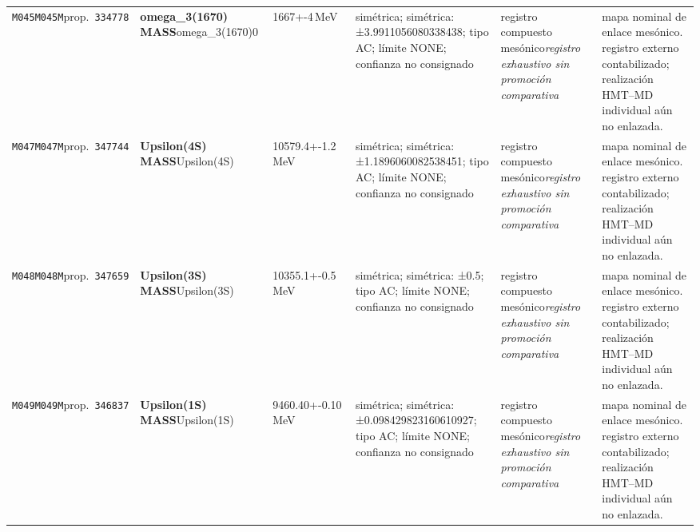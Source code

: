 \begin{landscape}
\begin{longtable}{L{1.85cm}L{4.45cm}L{2.35cm}L{4.05cm}L{3.35cm}L{7.15cm}}
\texttt{M045}\newline \texttt{M045M}\newline prop.\ \texttt{334778} & \textbf{omega\_\allowbreak{}3(1670) MASS}\newline omega\_\allowbreak{}3(1670)0 & 1667+-4\,MeV & simétrica; simétrica: ±3.9911056080338438; tipo AC; límite NONE; confianza no consignado & registro compuesto mesónico\newline \emph{registro exhaustivo sin promoción comparativa} & mapa nominal de enlace mesónico. registro externo contabilizado; realización HMT--MD individual aún no enlazada. \\
\texttt{M047}\newline \texttt{M047M}\newline prop.\ \texttt{347744} & \textbf{Upsilon(4S) MASS}\newline Upsilon(4S) & 10579.4+-1.2\,MeV & simétrica; simétrica: ±1.1896060082538451; tipo AC; límite NONE; confianza no consignado & registro compuesto mesónico\newline \emph{registro exhaustivo sin promoción comparativa} & mapa nominal de enlace mesónico. registro externo contabilizado; realización HMT--MD individual aún no enlazada. \\
\texttt{M048}\newline \texttt{M048M}\newline prop.\ \texttt{347659} & \textbf{Upsilon(3S) MASS}\newline Upsilon(3S) & 10355.1+-0.5\,MeV & simétrica; simétrica: ±0.5; tipo AC; límite NONE; confianza no consignado & registro compuesto mesónico\newline \emph{registro exhaustivo sin promoción comparativa} & mapa nominal de enlace mesónico. registro externo contabilizado; realización HMT--MD individual aún no enlazada. \\
\texttt{M049}\newline \texttt{M049M}\newline prop.\ \texttt{346837} & \textbf{Upsilon(1S) MASS}\newline Upsilon(1S) & 9460.40+-0.10\,MeV & simétrica; simétrica: ±0.098429823160610927; tipo AC; límite NONE; confianza no consignado & registro compuesto mesónico\newline \emph{registro exhaustivo sin promoción comparativa} & mapa nominal de enlace mesónico. registro externo contabilizado; realización HMT--MD individual aún no enlazada. \\

\end{longtable}
\end{landscape}
